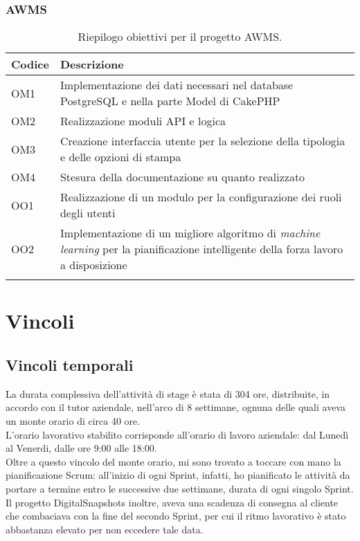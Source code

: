 \subsubsection*{AWMS}
\begin{center}
	\renewcommand{\arraystretch}{1.5}
	\begin{longtable}{ | p{0.1\linewidth} | p{0.9\linewidth} | }	 
		\hline   
	    \rowcolor{header}\textbf{Codice}&\textbf{Descrizione}\\
		\hline   	
    	OM1 & Implementazione dei dati necessari nel database PostgreSQL e nella parte Model di CakePHP \\
    	OM2 & Realizzazione moduli API e logica \\
    	OM3 & Creazione interfaccia utente per la selezione della tipologia e delle opzioni di stampa \\
    	OM4 & Stesura della documentazione su quanto realizzato \\
    	OO1 & Realizzazione di un modulo per la configurazione dei ruoli degli utenti \\
    	OO2 & Implementazione di un migliore algoritmo di \textit{machine learning} per la pianificazione intelligente della forza lavoro a disposizione \\
    	\hline
    	\rowcolor{white}
    	\caption{Riepilogo obiettivi per il progetto AWMS.}
	\end{longtable}
	\label{tab:obiettivi-AWMS}
\end{center}

\section{Vincoli}
\subsection{Vincoli temporali}
\label{subsec:vincoli-temporali}

La durata complessiva dell'attività di stage è stata di 304 ore, distribuite, in accordo con il tutor aziendale, nell'arco di 8 settimane, ognuna delle quali aveva un monte orario di circa 40 ore. \\
L'orario lavorativo stabilito corrisponde all'orario di lavoro aziendale: dal Lunedì al Venerdi, dalle ore 9:00 alle 18:00.\\
Oltre a questo vincolo del monte orario, mi sono trovato a toccare con mano la pianificazione Scrum: all'inizio di ogni Sprint, infatti, ho pianificato le attività da portare a termine entro le successive due settimane, durata di ogni singolo Sprint.\\
Il progetto DigitalSnapshots inoltre, aveva una scadenza di consegna al cliente che combaciava con la fine del secondo Sprint, per cui il ritmo lavorativo è stato abbastanza elevato per non eccedere tale data.

